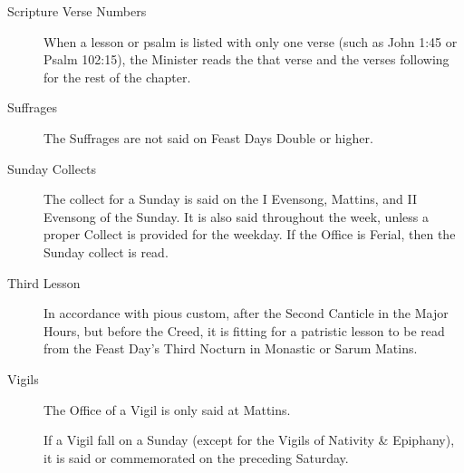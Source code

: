 \begin{description}
\item[Scripture Verse Numbers] When a lesson or psalm is listed with only one verse (such as John 1:45 or Psalm 102:15), the Minister reads the that verse and the verses following for the rest of the chapter.
\item[Suffrages] The Suffrages are not said on Feast Days Double or higher.
\item[Sunday Collects] The collect for a Sunday is said on the I Evensong, Mattins, and II Evensong of the Sunday. It is also said throughout the week, unless a proper Collect is provided for the weekday. If the Office is Ferial, then the Sunday collect is read. %
\item[Third Lesson] In accordance with pious custom, after the Second Canticle in the Major Hours, but before the Creed, it is fitting for a patristic lesson to be read from the Feast Day's Third Nocturn in Monastic or Sarum Matins.
\item[Vigils] %
The Office of a Vigil is only said at Mattins.\par
If a Vigil fall on a Sunday (except for the Vigils of Nativity \& Epiphany), it is said or commemorated on the preceding Saturday.
\end{description}
